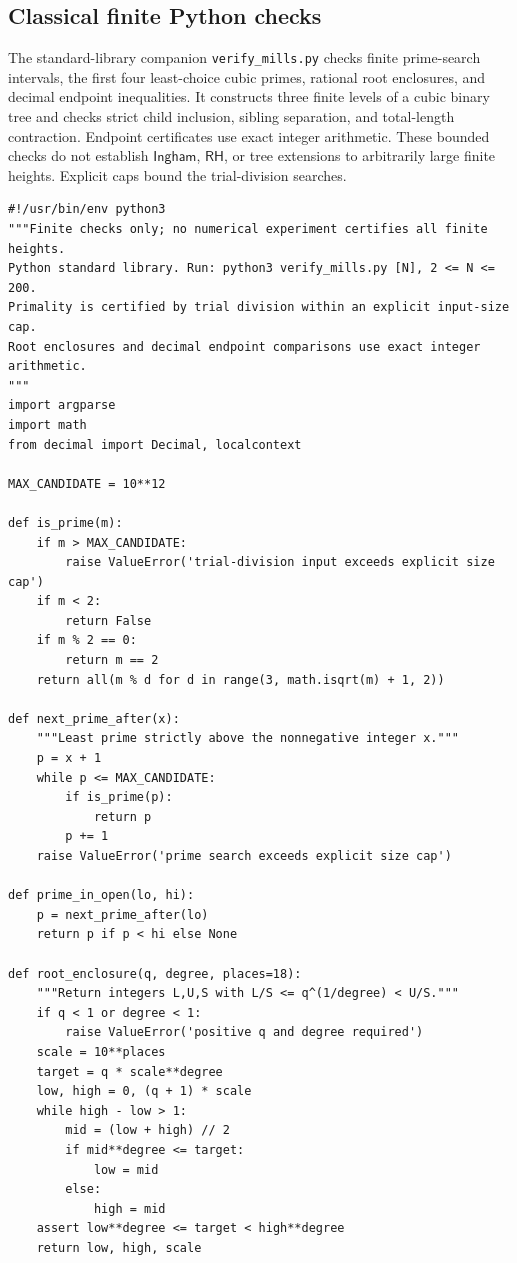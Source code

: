 \documentclass[11pt,reqno]{amsart}
\theoremstyle{blueplain}
\newcounter{asser}
\numberwithin{equation}{section}
\begin{document}
\subsection{Classical finite Python checks}\label{sec:scripts-python}
The standard-library companion \texttt{verify\_mills.py} checks finite
prime-search intervals, the first four least-choice cubic primes,
rational root enclosures, and decimal endpoint inequalities.
It constructs three finite levels of a cubic binary tree and checks
strict child inclusion, sibling separation, and total-length contraction.
Endpoint certificates use exact integer arithmetic.
These bounded checks do not establish \(\textsf{Ingham}\),
\(\textsf{RH}\), or tree extensions to arbitrarily large finite heights.
Explicit caps bound the trial-division searches.
\begin{lstlisting}[style=python,basicstyle=\ttfamily\scriptsize,numberstyle=\scriptsize]
#!/usr/bin/env python3
"""Finite checks only; no numerical experiment certifies all finite heights.
Python standard library. Run: python3 verify_mills.py [N], 2 <= N <= 200.
Primality is certified by trial division within an explicit input-size cap.
Root enclosures and decimal endpoint comparisons use exact integer arithmetic.
"""
import argparse
import math
from decimal import Decimal, localcontext

MAX_CANDIDATE = 10**12

def is_prime(m):
    if m > MAX_CANDIDATE:
        raise ValueError('trial-division input exceeds explicit size cap')
    if m < 2:
        return False
    if m % 2 == 0:
        return m == 2
    return all(m % d for d in range(3, math.isqrt(m) + 1, 2))

def next_prime_after(x):
    """Least prime strictly above the nonnegative integer x."""
    p = x + 1
    while p <= MAX_CANDIDATE:
        if is_prime(p):
            return p
        p += 1
    raise ValueError('prime search exceeds explicit size cap')

def prime_in_open(lo, hi):
    p = next_prime_after(lo)
    return p if p < hi else None

def root_enclosure(q, degree, places=18):
    """Return integers L,U,S with L/S <= q^(1/degree) < U/S."""
    if q < 1 or degree < 1:
        raise ValueError('positive q and degree required')
    scale = 10**places
    target = q * scale**degree
    low, high = 0, (q + 1) * scale
    while high - low > 1:
        mid = (low + high) // 2
        if mid**degree <= target:
            low = mid
        else:
            high = mid
    assert low**degree <= target < high**degree
    return low, high, scale


\end{lstlisting}
\end{document}
